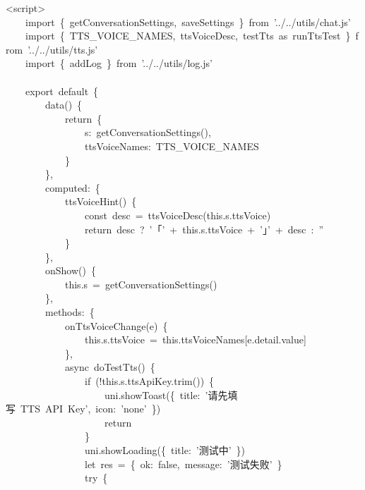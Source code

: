 \documentclass[a4paper,10pt]{article}
\begin{document}
{\ttfamily\footnotesize\raggedright
<script>\\
~~~~import~\{~getConversationSettings,~saveSettings~\}~from~'../../utils/chat.js'\\
~~~~import~\{~TTS\_VOICE\_NAMES,~ttsVoiceDesc,~testTts~as~runTtsTest~\}~from~'../../utils/tts.js'\\
~~~~import~\{~addLog~\}~from~'../../utils/log.js'\\
\mbox{}\\
~~~~export~default~\{\\
~~~~~~~~data()~\{\\
~~~~~~~~~~~~return~\{\\
~~~~~~~~~~~~~~~~s:~getConversationSettings(),\\
~~~~~~~~~~~~~~~~ttsVoiceNames:~TTS\_VOICE\_NAMES\\
~~~~~~~~~~~~\}\\
~~~~~~~~\},\\
~~~~~~~~computed:~\{\\
~~~~~~~~~~~~ttsVoiceHint()~\{\\
~~~~~~~~~~~~~~~~const~desc~=~ttsVoiceDesc(this.s.ttsVoice)\\
~~~~~~~~~~~~~~~~return~desc~?~'「'~+~this.s.ttsVoice~+~'」'~+~desc~:~''\\
~~~~~~~~~~~~\}\\
~~~~~~~~\},\\
~~~~~~~~onShow()~\{\\
~~~~~~~~~~~~this.s~=~getConversationSettings()\\
~~~~~~~~\},\\
~~~~~~~~methods:~\{\\
~~~~~~~~~~~~onTtsVoiceChange(e)~\{\\
~~~~~~~~~~~~~~~~this.s.ttsVoice~=~this.ttsVoiceNames[e.detail.value]\\
~~~~~~~~~~~~\},\\
~~~~~~~~~~~~async~doTestTts()~\{\\
~~~~~~~~~~~~~~~~if~(!this.s.ttsApiKey.trim())~\{\\
~~~~~~~~~~~~~~~~~~~~uni.showToast(\{~title:~'请先填写~TTS~API~Key',~icon:~'none'~\})\\
~~~~~~~~~~~~~~~~~~~~return\\
~~~~~~~~~~~~~~~~\}\\
~~~~~~~~~~~~~~~~uni.showLoading(\{~title:~'测试中'~\})\\
~~~~~~~~~~~~~~~~let~res~=~\{~ok:~false,~message:~'测试失败'~\}\\
~~~~~~~~~~~~~~~~try~\{\\
}
\end{document}

